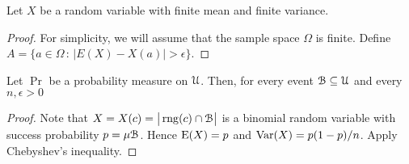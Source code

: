 \documentclass[sputnik.tex]{subfiles}
\begin{document}
\begin{void_thm}\label{Chebyshev}
Let $X$ be a random variable with finite mean and finite variance.

\end{void_thm}


\begin{proof}
For simplicity, we will assume that the sample space $\Omega$ is finite. Define $A=\{a\in\Omega\,:\, |E(X)-X(a)|>\epsilon\}$.





\end{proof}

\begin{void_thm}\label{wlln}
Let $\Pr$ be a probability measure on $\EuScript U$.
Then, for every event $\EuScript B\subseteq\EuScript U$ and every $n,\epsilon>0$

\end{void_thm}


\begin{proof}
Note that $X=X(c)=\big|\mathop{\rm rng}(c)\cap\EuScript B\big|$ is a binomial random variable with success probability $p=\mu\EuScript B$. 
Hence ${\rm E}(X)=p$ and  ${\rm Var}(X)=p(1-p)/n$.
Apply Chebyshev's inequality.
\end{proof}
\end{document}
